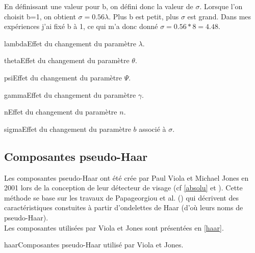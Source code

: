 \documentclass[poster]{polytech/polytech}
\begin{document}
En définissant une valeur pour b, on défini donc la valeur de $\sigma $. Lorsque l'on choisit b=1, on obtient $\sigma =0.56\lambda $. Plus b est petit, plus $\sigma $ est grand. Dans mes expériences j'ai fixé b à 1, ce qui m'a donc donné $\sigma = 0.56 * 8 = 4.48$.
\newpage
\begin{Figure}{lambda}{Effet du changement du paramètre $\lambda $}.
\end{Figure}
\begin{Figure}{theta}{Effet du changement du paramètre $\theta $}.
\end{Figure}
\newpage
\begin{Figure}{psi}{Effet du changement du paramètre $\Psi $}.
\end{Figure}
\begin{Figure}{gamma}{Effet du changement du paramètre $\gamma $}.
\end{Figure}
\newpage
\begin{Figure}{n}{Effet du changement du paramètre $n $}.
\end{Figure}
\begin{Figure}{sigma}{Effet du changement du paramètre $b $ associé à $\sigma $}.
\end{Figure}

\subsection{Composantes pseudo-Haar}
Les composantes pseudo-Haar ont été crée par Paul Viola et Michael Jones en 2001 lors de la conception de leur détecteur de visage (cf \autoref{absolu} et \cite{violajones}). Cette méthode se base sur les travaux de Papageorgiou et al. (\cite{papa}) qui décrivent des caractéristiques constuites à partir d'ondelettes de Haar (d'où leurs noms de pseudo-Haar).\\
Les composantes utilisées par Viola et Jones sont présentées en \autoref{haar}.

\begin{Figure}{haar}{Composantes pseudo-Haar utilisé par Viola et Jones}.
\end{Figure}
\end{document}
